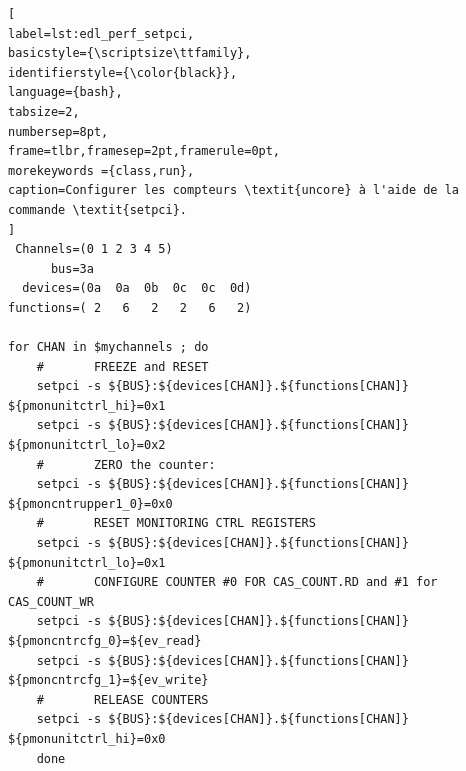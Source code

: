 \begin{minipage}{\linewidth}
\begin{lstlisting}[
label=lst:edl_perf_setpci,
basicstyle={\scriptsize\ttfamily},
identifierstyle={\color{black}},
language={bash},
tabsize=2,
numbersep=8pt,
frame=tlbr,framesep=2pt,framerule=0pt,
morekeywords ={class,run},
caption=Configurer les compteurs \textit{uncore} à l'aide de la commande \textit{setpci}.
]
 Channels=(0 1 2 3 4 5)
      bus=3a
  devices=(0a  0a  0b  0c  0c  0d)
functions=( 2   6   2   2   6   2)

for CHAN in $mychannels ; do
    #       FREEZE and RESET
    setpci -s ${BUS}:${devices[CHAN]}.${functions[CHAN]} ${pmonunitctrl_hi}=0x1        
    setpci -s ${BUS}:${devices[CHAN]}.${functions[CHAN]} ${pmonunitctrl_lo}=0x2
    #       ZERO the counter:        
    setpci -s ${BUS}:${devices[CHAN]}.${functions[CHAN]} ${pmoncntrupper1_0}=0x0  
    #       RESET MONITORING CTRL REGISTERS        
    setpci -s ${BUS}:${devices[CHAN]}.${functions[CHAN]} ${pmonunitctrl_lo}=0x1
    #       CONFIGURE COUNTER #0 FOR CAS_COUNT.RD and #1 for CAS_COUNT_WR        
    setpci -s ${BUS}:${devices[CHAN]}.${functions[CHAN]} ${pmoncntrcfg_0}=${ev_read}        
    setpci -s ${BUS}:${devices[CHAN]}.${functions[CHAN]} ${pmoncntrcfg_1}=${ev_write}
    #       RELEASE COUNTERS        
    setpci -s ${BUS}:${devices[CHAN]}.${functions[CHAN]} ${pmonunitctrl_hi}=0x0
    done
\end{lstlisting}
\end{minipage}
    
    
    
    
